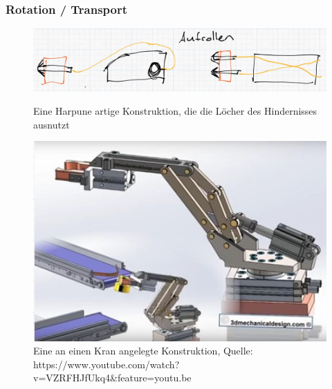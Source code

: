 \newpage
\subsubsection{Rotation / Transport}
\begin{figure}[h!]
    \centering
    \begin{minipage}{0.45\textwidth}
        \centering
        \includegraphics[width=\textwidth]{img/technologierecherche/Rotation/harponne.jpg}
        \caption{Eine Harpune artige Konstruktion, die die Löcher des Hindernisses ausnutzt}
        \label{img:tech_harponne}
    \end{minipage}
    \hfill
    \begin{minipage}{0.45\textwidth}
        \centering
        \includegraphics[width=\textwidth]{img/technologierecherche/Rotation/kran.jpg}
        \caption{Eine an einen Kran angelegte Konstruktion, Quelle: https://www.youtube.com/watch?v=VZRFHJfUkq4\&feature=youtu.be} 
        \label{img:tech_kran}
    \end{minipage}
\end{figure}

